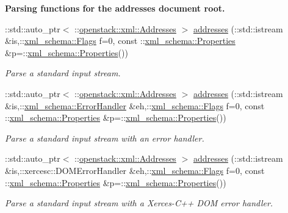 \begin{Indent}{\bf Parsing functions for the addresses document root.}
\begin{DoxyCompactItemize}
::std::auto\_\-ptr$<$ ::\hyperlink{classopenstack_1_1xml_1_1Addresses}{openstack::xml::Addresses} $>$ \hyperlink{namespaceopenstack_1_1xml_a6a3b8ed6228e64cbbb3b6946f52b0fef}{addresses} (::std::istream \&is,::\hyperlink{namespacexml__schema_affb4c227cbd9aa7453dd1dc5a1401943}{xml\_\-schema::Flags} f=0, const ::\hyperlink{namespacexml__schema_ad27ce19a7ee1d3b1064092648898f64c}{xml\_\-schema::Properties} \&p=::\hyperlink{namespacexml__schema_ad27ce19a7ee1d3b1064092648898f64c}{xml\_\-schema::Properties}())
\begin{DoxyCompactList}\small\item\em Parse a standard input stream. \item\end{DoxyCompactList}\item 
::std::auto\_\-ptr$<$ ::\hyperlink{classopenstack_1_1xml_1_1Addresses}{openstack::xml::Addresses} $>$ \hyperlink{namespaceopenstack_1_1xml_ab48665276ab5ca039bc02384e82a4f9d}{addresses} (::std::istream \&is,::\hyperlink{namespacexml__schema_ab1c9361bfd3b404eaabf0c31eded79dc}{xml\_\-schema::ErrorHandler} \&eh,::\hyperlink{namespacexml__schema_affb4c227cbd9aa7453dd1dc5a1401943}{xml\_\-schema::Flags} f=0, const ::\hyperlink{namespacexml__schema_ad27ce19a7ee1d3b1064092648898f64c}{xml\_\-schema::Properties} \&p=::\hyperlink{namespacexml__schema_ad27ce19a7ee1d3b1064092648898f64c}{xml\_\-schema::Properties}())
\begin{DoxyCompactList}\small\item\em Parse a standard input stream with an error handler. \item\end{DoxyCompactList}\item 
::std::auto\_\-ptr$<$ ::\hyperlink{classopenstack_1_1xml_1_1Addresses}{openstack::xml::Addresses} $>$ \hyperlink{namespaceopenstack_1_1xml_a1592fd96763ad59629d51d06752c9cfb}{addresses} (::std::istream \&is,::xercesc::DOMErrorHandler \&eh,::\hyperlink{namespacexml__schema_affb4c227cbd9aa7453dd1dc5a1401943}{xml\_\-schema::Flags} f=0, const ::\hyperlink{namespacexml__schema_ad27ce19a7ee1d3b1064092648898f64c}{xml\_\-schema::Properties} \&p=::\hyperlink{namespacexml__schema_ad27ce19a7ee1d3b1064092648898f64c}{xml\_\-schema::Properties}())
\begin{DoxyCompactList}\small\item\em Parse a standard input stream with a Xerces-\/C++ DOM error handler. \item\end{DoxyCompactList}\item 

\end{DoxyCompactItemize}
\end{Indent}
